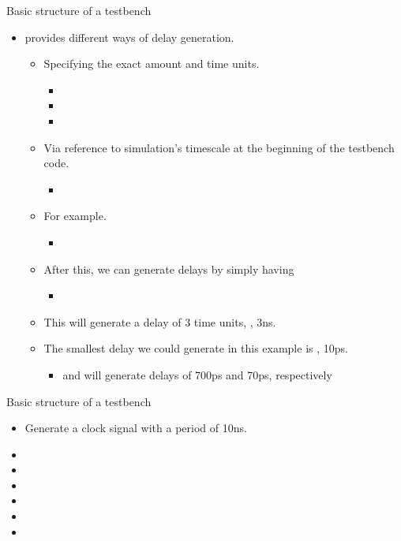 %
\begin{frame}{Basic structure of a testbench}{}
\begin{itemize}
\item \SV provides different ways of delay generation.
\begin{itemize}
\item Specifying the exact amount and time units.
\begin{itemize}
\item[] 
\item[] 
\item[] 
\end{itemize}
\pauseprint
\item Via reference to simulation's timescale at the beginning of the testbench code.
\begin{itemize}
\item[] 
\end{itemize}
\pauseprint
\item For example.
\begin{itemize}
\item[] 
\end{itemize}
\item After this, we can generate delays by simply having
\begin{itemize}
\item[] 
\end{itemize}
\item This will generate a delay of 3 time units, \ie, 3ns.
\item The smallest delay we could generate in this example is  \ie, 10ps.
\begin{itemize}
\item[]  and  will generate delays of 700ps and 70ps, respectively
\end{itemize}
\end{itemize}
\end{itemize}
\end{frame}

%
\begin{frame}{Basic structure of a testbench}{}
\begin{itemize}
\item Generate a clock signal with a period of 10ns.
\pauseprint
\item[] \code{\textcolor{blue}{always begin}}
\item[] 
\item[] 
\item[] 
\item[] 
\item[] \code{\textcolor{blue}{end}}
\end{itemize}
\end{frame}


